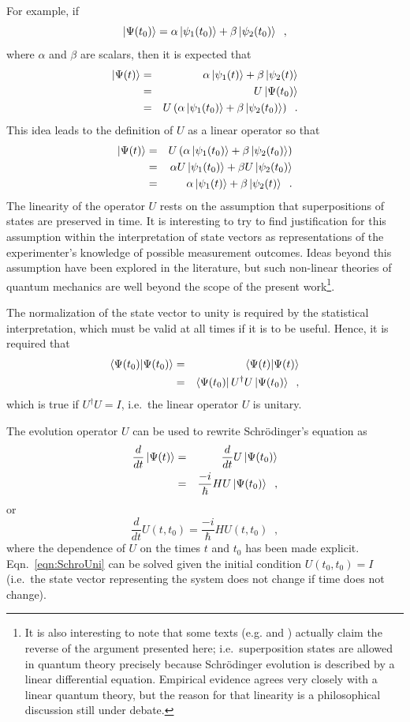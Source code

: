 For example, if 
$$
\left|\Psi(t_0)\right\rangle = \alpha\left|\psi_1(t_0)\right\rangle+\beta\left|\psi_2(t_0)\right\rangle\;\;,
$$
where $\alpha$ and $\beta$ are scalars, then it is expected that 
\begin{eqnarray*}
\left|\Psi(t)\right\rangle &=& \alpha \left|\psi_1(t)\right\rangle+\beta \left|\psi_2(t)\right\rangle\\
&=& U\left|\Psi(t_0)\right\rangle\\
&=& U\left(\alpha \left|\psi_1(t_0)\right\rangle+\beta \left|\psi_2(t_0)\right\rangle\right)\;\;.
\end{eqnarray*}
This idea leads to the definition of $U$ as a linear operator so that
\begin{eqnarray*}
\left|\Psi(t)\right\rangle &=& U\left(\alpha \left|\psi_1(t_0)\right\rangle+\beta \left|\psi_2(t_0)\right\rangle\right)\\
&=& \alpha U\left|\psi_1(t_0)\right\rangle+\beta U\left|\psi_2(t_0)\right\rangle\\
&=& \alpha \left|\psi_1(t)\right\rangle+\beta \left|\psi_2(t)\right\rangle\;\;.
\end{eqnarray*}
The linearity of the operator $U$ rests on the assumption that superpositions of states are preserved in time.  It is interesting to try to find justification for this assumption within the interpretation of state vectors as representations of the experimenter's knowledge of possible measurement outcomes.  Ideas beyond this assumption have been explored in the literature, but such non-linear theories of quantum mechanics are well beyond the scope of the present work\footnote{It is also interesting to note that some texts (e.g. \cite{Schwabl2007} and \cite{Merzbacher1998}) actually claim the reverse of the argument presented here; i.e.\ superposition states are allowed in quantum theory precisely because Schr\"{o}dinger evolution is described by a linear differential equation.  Empirical evidence agrees very closely with a linear quantum theory, but the reason for that linearity is a philosophical discussion still under debate.}.

The normalization of the state vector to unity is required by the statistical interpretation, which must be valid at all times if it is to be useful.  Hence, it is required that
\begin{eqnarray*}
\langle \Psi(t_0)|\Psi(t_0)\rangle &=& \langle \Psi(t)|\Psi(t)\rangle\\
&=& \left\langle\Psi(t_0)\right|U^\dagger U \left|\Psi(t_0)\right\rangle\;\;,
\end{eqnarray*}  
which is true if $U^\dagger U = I$, i.e.\ the linear operator $U$ is unitary.

The evolution operator $U$ can be used to rewrite Schr\"{o}dinger's equation as
\begin{eqnarray*}
\frac{d}{dt}\left|\Psi(t)\right\rangle &=& \frac{d}{dt} U\left|\Psi(t_0)\right\rangle \\
&=& \frac{-i}{\hbar} H U\left|\Psi(t_0)\right\rangle\;\;,
\end{eqnarray*}
or
\begin{equation}
\label{eqn:SchroUni}
\frac{d}{dt} U(t,t_0) = \frac{-i}{\hbar} H U(t,t_0)\;\;,
\end{equation}
where the dependence of $U$ on the times $t$ and $t_0$ has been made explicit.  Eqn.\ \ref{eqn:SchroUni} can be solved given the initial condition $U(t_0,t_0) = I$ (i.e.\ the state vector representing the system does not change if time does not change).

